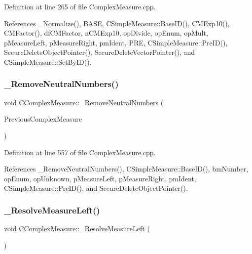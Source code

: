 Definition at line 265 of file Complex\+Measure.\+cpp.



References \+\_\+\+Normalize(), B\+A\+SE, C\+Simple\+Measure\+::\+Base\+I\+D(), C\+M\+Exp10(), C\+M\+Factor(), df\+C\+M\+Factor, n\+C\+M\+Exp10, op\+Divide, op\+Enum, op\+Mult, p\+Measure\+Left, p\+Measure\+Right, pm\+Ident, P\+RE, C\+Simple\+Measure\+::\+Pre\+I\+D(), Secure\+Delete\+Object\+Pointer(), Secure\+Delete\+Vector\+Pointer(), and C\+Simple\+Measure\+::\+Set\+By\+I\+D().

\mbox{\label{classCComplexMeasure_a9eb89170847ab2ef592eace6453cf300}} 
\subsubsection{\texorpdfstring{\+\_\+\+Remove\+Neutral\+Numbers()}{\_RemoveNeutralNumbers()}}
{\footnotesize\ttfamily void C\+Complex\+Measure\+::\+\_\+\+Remove\+Neutral\+Numbers (\begin{DoxyParamCaption}\item[{\hyperlink{classCComplexMeasure}{C\+Complex\+Measure} \&}]{Previous\+Complex\+Measure }\end{DoxyParamCaption})\hspace{0.3cm}{\ttfamily [protected]}}



Definition at line 557 of file Complex\+Measure.\+cpp.



References \+\_\+\+Remove\+Neutral\+Numbers(), C\+Simple\+Measure\+::\+Base\+I\+D(), bm\+Number, op\+Enum, op\+Unknown, p\+Measure\+Left, p\+Measure\+Right, pm\+Ident, C\+Simple\+Measure\+::\+Pre\+I\+D(), and Secure\+Delete\+Object\+Pointer().

\mbox{\label{classCComplexMeasure_a8f642a3a0044d4dc0492774bca8666e9}} 
\subsubsection{\texorpdfstring{\+\_\+\+Resolve\+Measure\+Left()}{\_ResolveMeasureLeft()}}
{\footnotesize\ttfamily void C\+Complex\+Measure\+::\+\_\+\+Resolve\+Measure\+Left (\begin{DoxyParamCaption}{ }\end{DoxyParamCaption})\hspace{0.3cm}{\ttfamily [protected]}}



